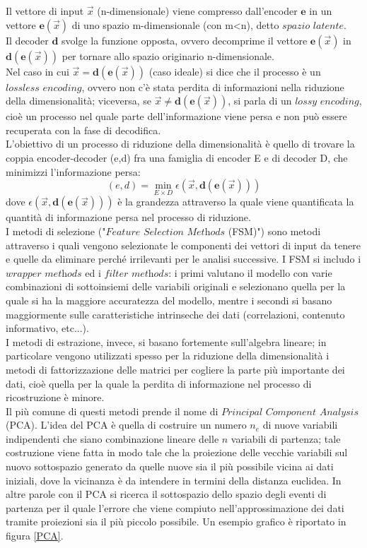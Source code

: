 Il vettore di input $\vec{x}$ (n-dimensionale) viene compresso dall'encoder $\textbf{e}$ in un vettore $\textbf{e}(\vec{x})$ di uno spazio m-dimensionale (con m<n), detto $\textit{spazio latente}$. \\
Il decoder $\textbf{d}$ svolge la funzione opposta, ovvero decomprime il vettore $\textbf{e}(\vec{x})$ in $\textbf{d}(\textbf{e}(\vec{x}))$ per tornare allo spazio originario n-dimensionale. \\
Nel caso in cui $\vec{x} = \textbf{d}(\textbf{e}(\vec{x}))$ (caso ideale) si dice che il processo è un $\textit{lossless encoding}$, ovvero non c'è stata perdita di informazioni nella riduzione della dimensionalità; viceversa, se $\vec{x} \not= \textbf{d}(\textbf{e}(\vec{x}))$, si parla di un $\textit{lossy encoding}$, cioè un processo nel quale parte dell'informazione viene persa e non può essere recuperata con la fase di decodifica. \\
L'obiettivo di un processo di riduzione della dimensionalità è quello di trovare la coppia encoder-decoder (e,d) fra una famiglia di encoder E e di decoder D, che minimizzi l'informazione persa:
\begin{equation}
(e,d) = \min_{E \times D} \epsilon (\vec{x},\textbf{d}(\textbf{e}(\vec{x})))
\end{equation}
dove $\epsilon (\vec{x},\textbf{d}(\textbf{e}(\vec{x})))$ è la grandezza attraverso la quale viene  quantificata la quantità di informazione persa nel processo di riduzione. \\
I metodi di selezione ("$\textit{Feature Selection Methods}$ (FSM)") sono metodi attraverso i quali vengono selezionate le componenti dei vettori di input da tenere e quelle da eliminare perché irrilevanti per le analisi successive. I FSM si includo i $\textit{wrapper methods}$ ed i $\textit{filter methods}$: i primi valutano il modello con varie combinazioni di sottoinsiemi delle variabili originali e selezionano quella per la quale si ha la maggiore accuratezza del modello, mentre i secondi si basano maggiormente sulle caratteristiche intrinseche dei dati (correlazioni, contenuto informativo, etc...). \\
I metodi di estrazione, invece, si basano fortemente sull'algebra lineare; in particolare vengono utilizzati spesso per la riduzione della dimensionalità i metodi di fattorizzazione delle matrici per cogliere la parte più importante dei dati, cioè quella per la quale la perdita di informazione nel processo di ricostruzione è minore. \\
Il più comune di questi metodi prende il nome di $\textit{Principal Component Analysis}$ (PCA). L'idea del PCA è quella di costruire un numero $\textit{n}_\textit{e}$ di nuove variabili indipendenti che siano combinazione lineare delle $\textit{n}$ variabili di partenza; tale costruzione viene fatta in modo tale che la proiezione delle vecchie variabili sul nuovo sottospazio generato da quelle nuove sia il più possibile vicina ai dati iniziali, dove la vicinanza è da intendere in termini della distanza euclidea. In altre parole con il PCA si ricerca il sottospazio dello spazio degli eventi di partenza per il quale l'errore che viene compiuto nell'approssimazione dei dati tramite proiezioni sia il più piccolo possibile. Un esempio grafico è riportato in figura \ref{PCA}.
